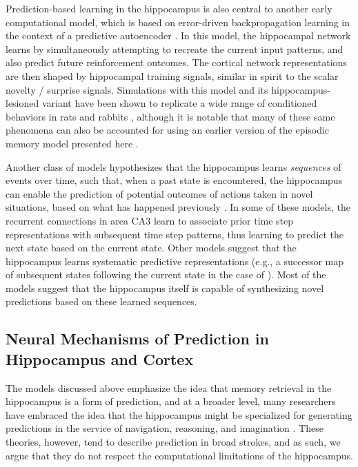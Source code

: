 \documentclass[11pt,twoside]{article}
\newif\myifpdf
\begin{document}
Prediction-based learning in the hippocampus is also central to another early computational model, which is based on error-driven backpropagation learning in the context of a predictive autoencoder \citep{MyersGluck95}.  In this model, the hippocampal network learns by simultaneously attempting to recreate the current input patterns, and also predict future reinforcement outcomes.  The cortical network representations are then shaped by hippocampal training signals, similar in spirit to the scalar novelty / surprise signals.  Simulations with this model and its hippocampus-lesioned variant have been shown to replicate a wide range of conditioned behaviors in rats and rabbits \citep{GluckMyers94}, although it is notable that many of these same phenomena can also be accounted for using an earlier version of the episodic memory model presented here \citep{OReillyRudy01}. 

Another class of models hypothesizes that the hippocampus learns \emph{sequences} of events over time, such that, when a past state is encountered, the hippocampus can enable the prediction of potential outcomes of actions taken in novel situations, based on what has happened previously \citep{Levy96,WallensteinHasselmo97,JensenLisman96,TsodyksSkaggsSejnowskiEtAl96,Rolls13,SchapiroTurk-BrowneBotvinickEtAl17,StachenfeldBotvinickGershman17}. In some of these models, the recurrent connections in area CA3 learn to associate prior time step representations with subsequent time step patterns, thus learning to predict the next state based on the current state.  Other models suggest that the hippocampus learns systematic predictive representations (e.g., a successor map of subsequent states following the current state in the case of \citealp{StachenfeldBotvinickGershman17}).  Most of the models suggest that the hippocampus itself is capable of synthesizing novel predictions based on these learned sequences. 

\subsection{Neural Mechanisms of Prediction in Hippocampus and Cortex}

The models discussed above emphasize the idea that memory retrieval in the hippocampus is a form of prediction, and at a broader level, many researchers have embraced the idea that the hippocampus might be specialized for generating predictions in the service of navigation, reasoning, and imagination \citep{Buckner10,DavachiDuBrow15,KokTurk-Browne18,Mizumori13,LismanRedish09,ZeithamovaSchlichtingPreston12,MackLovePreston18,ZeithamovaSchlichtingPreston12,JungLeeJeongEtAl18}. These theories, however, tend to describe prediction in broad strokes, and as such, we argue that they do not respect the computational limitations of the hippocampus.
\end{document}
